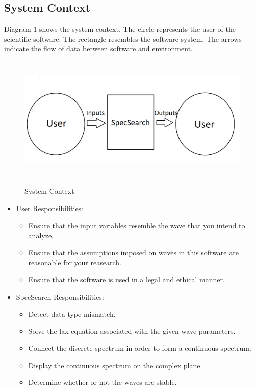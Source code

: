 \documentclass[12pt]{article}
\begin{document}
\subsection{System Context} 
Diagram 1 shows the system context. The circle represents the user of the 
scientific software. The rectangle resembles the software system. The arrows 
indicate the flow of data between software and environment. 
 \begin{figure}[h!]
	\begin{center}
		{
			\includegraphics[width=15cm,height=6cm]{SystemContext.png}
		} 
	\caption{System Context}
	\end{center}
 \end{figure}

 
\begin{itemize}
\item User Responsibilities:
\begin{itemize}
\item Ensure that the input variables resemble the wave that you intend 
to analyze.
\item Ensure that the assumptions imposed on waves in this software are 
reasonable 
for your reasearch.
\item Ensure that the software is used in a legal and ethical manner.

\end{itemize}
\item SpecSearch Responsibilities:

\begin{itemize}
\item Detect data type mismatch. 
\item Solve the lax equation associated with the given wave parameters. 
\item Connect the discrete spectrum in order to form a continuous spectrum. 
\item Display the continuous spectrum on the complex plane.
\item Determine whether or not the waves are stable. 
\end{itemize}
\end{itemize}
\end{document}
